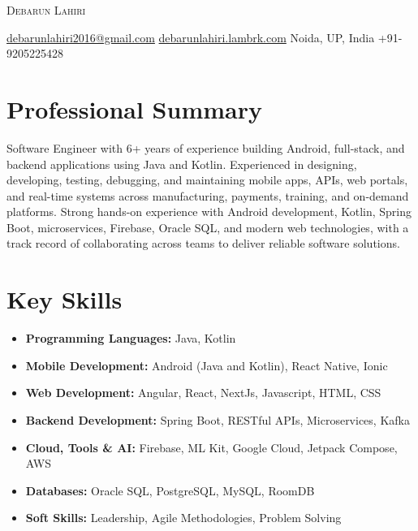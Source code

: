 \documentclass[10pt, a4paper]{article}
\begin{document}
\begin{center}
    {\Huge \scshape Debarun Lahiri}
    \vspace{1ex}

    \href{mailto:debarunlahiri2016@gmail.com}{debarunlahiri2016@gmail.com} \quad\textbar\quad
    \href{https://debarunlahiri-web.vercel.app/}{debarunlahiri.lambrk.com} \quad\textbar\quad
    Noida, UP, India \quad\textbar\quad
    +91-9205225428
\end{center}

\section*{Professional Summary}
Software Engineer with 6+ years of experience building Android, full-stack, and backend applications using Java and Kotlin. Experienced in designing, developing, testing, debugging, and maintaining mobile apps, APIs, web portals, and real-time systems across manufacturing, payments, training, and on-demand platforms. Strong hands-on experience with Android development, Kotlin, Spring Boot, microservices, Firebase, Oracle SQL, and modern web technologies, with a track record of collaborating across teams to deliver reliable software solutions.

\section*{Key Skills}
\begin{itemize}[leftmargin=*, label={}, itemsep=0.25ex]
    \item \textbf{Programming Languages:} Java, Kotlin
    \item \textbf{Mobile Development:} Android (Java and Kotlin), React Native, Ionic
    \item \textbf{Web Development:} Angular, React, NextJs, Javascript, HTML, CSS
    \item \textbf{Backend Development:} Spring Boot, RESTful APIs, Microservices, Kafka
    \item \textbf{Cloud, Tools \& AI:} Firebase, ML Kit, Google Cloud, Jetpack Compose, AWS
    \item \textbf{Databases:} Oracle SQL, PostgreSQL, MySQL, RoomDB
    \item \textbf{Soft Skills:} Leadership, Agile Methodologies, Problem Solving
\end{itemize}

\end{document}
